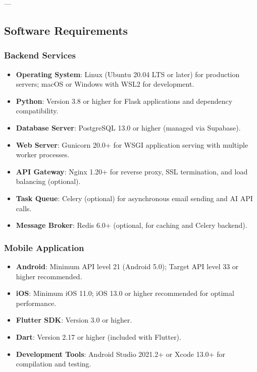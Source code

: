 ---

\subsection{Software Requirements}

\subsubsection{Backend Services}
\begin{itemize}
    \item \textbf{Operating System}: Linux (Ubuntu 20.04 LTS or later) for production servers; macOS or Windows with WSL2 for development.
    \item \textbf{Python}: Version 3.8 or higher for Flask applications and dependency compatibility.
    \item \textbf{Database Server}: PostgreSQL 13.0 or higher (managed via Supabase).
    \item \textbf{Web Server}: Gunicorn 20.0+ for WSGI application serving with multiple worker processes.
    \item \textbf{API Gateway}: Nginx 1.20+ for reverse proxy, SSL termination, and load balancing (optional).
    \item \textbf{Task Queue}: Celery (optional) for asynchronous email sending and AI API calls.
    \item \textbf{Message Broker}: Redis 6.0+ (optional, for caching and Celery backend).
\end{itemize}

\subsubsection{Mobile Application}
\begin{itemize}
    \item \textbf{Android}: Minimum API level 21 (Android 5.0); Target API level 33 or higher recommended.
    \item \textbf{iOS}: Minimum iOS 11.0; iOS 13.0 or higher recommended for optimal performance.
    \item \textbf{Flutter SDK}: Version 3.0 or higher.
    \item \textbf{Dart}: Version 2.17 or higher (included with Flutter).
    \item \textbf{Development Tools}: Android Studio 2021.2+ or Xcode 13.0+ for compilation and testing.
\end{itemize}

